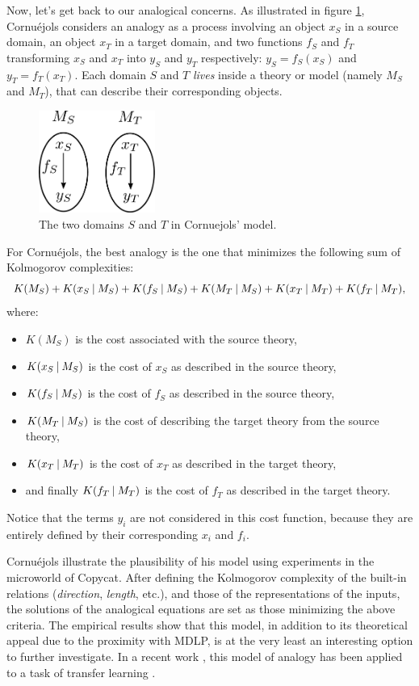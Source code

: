 Now, let's get back to our analogical concerns. As illustrated in figure
\ref{FIG:cornuejols_model}, Cornuéjols considers an analogy as a process
involving an object $x_S$ in a source domain, an object $x_T$ in a target
domain, and two functions $f_S$ and $f_T$ transforming $x_S$ and $x_T$ into
$y_S$ and $y_T$ respectively: $y_S = f_S(x_S)$ and $y_T = f_T(x_T)$. Each
domain $S$ and $T$ \textit{lives} inside a theory or model (namely $M_S$ and
$M_T$), that can describe their corresponding objects.

\begin{figure}[!h]
\centering
\includegraphics[width=1.5in]{figures/cornuejols_model.pdf}
\caption{The two domains $S$ and $T$ in Cornuejols' model.}
\label{FIG:cornuejols_model}
\end{figure}

For Cornuéjols, the best analogy is the one that minimizes the following sum of
Kolmogorov complexities:
$$K(M_S) + K(x_S \:\vert\: M_S) + K(f_S \:\vert\: M_S) + K(M_T \:\vert\: M_S) + K(x_T
\:\vert\: M_T) + K(f_T \:\vert\: M_T),$$
where:
\begin{itemize}
   \item $K(M_S)$ is the cost associated with the source theory,
   \item $K(x_S \:\vert\: M_S)$ is the cost of $x_S$ as described in the source
     theory,
   \item $K(f_S \:\vert\: M_S)$ is the cost of $f_S$ as described in the source
     theory,
   \item $K(M_T \:\vert\: M_S)$ is the cost of describing the target theory from
     the source theory,
   \item $K(x_T \:\vert\: M_T)$ is the cost of $x_T$ as described in the target
     theory,
   \item and finally $K(f_T \:\vert\: M_T)$ is the cost of $f_T$ as described in
     the target theory.
\end{itemize}

Notice that the terms $y_i$ are not considered in this cost function, because
they are entirely defined by their corresponding $x_i$ and $f_i$.

Cornuéjols illustrate the plausibility of his model using experiments in the
microworld of Copycat. After defining the Kolmogorov complexity of the built-in
relations (\textit{direction}, \textit{length}, etc.), and those of the
representations of the inputs, the solutions of the analogical equations are
set as those minimizing the above criteria. The empirical results show that
this model, in addition to its theoretical appeal due to the proximity with
MDLP, is at the very least an interesting option to further investigate. In a
recent work , this model of analogy has been applied to a task of transfer
learning \cite{CorMur16}.

